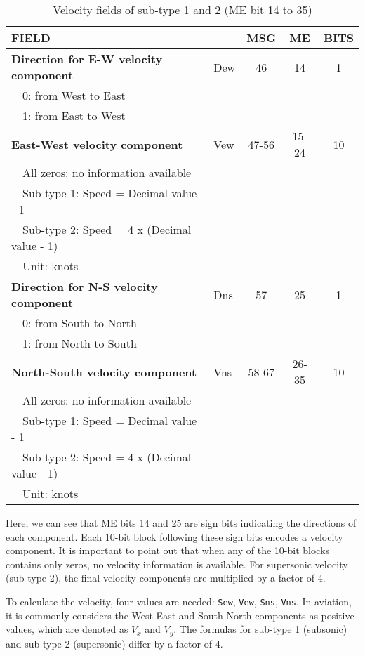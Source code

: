 \begin{table}[ht]
\caption{Velocity fields of sub-type 1 and 2 (ME bit 14 to 35)}
\label{tb:adsb-velocity-bits-14-35-gs}
\footnotesize
\begin{tabular}{|l|l|c|c|c|}
\hline
\textbf{FIELD} & & \textbf{MSG} & \textbf{ME} & \textbf{BITS} \\ \hline
\textbf{Direction for E-W velocity component} & Dew & 46 & 14 & 1\\
~~0: from West to East &&&&\\
~~1: from East to West &&&& \\ \hline
\textbf{East-West velocity component} & Vew & 47-56 & 15-24 & 10\\
~~All zeros: no information available &&&& \\
~~Sub-type 1: Speed = Decimal value - 1 &&&& \\
~~Sub-type 2: Speed = 4 x (Decimal value - 1) &&&& \\
~~Unit: knots &&&& \\ \hline
\textbf{Direction for N-S velocity component} & Dns & 57 & 25 & 1 \\
~~0: from South to North &&&& \\
~~1: from North to South &&&& \\ \hline
\textbf{North-South velocity component} & Vns & 58-67 & 26-35 & 10\\
~~All zeros: no information available &&&&\\
~~Sub-type 1: Speed = Decimal value - 1 &&&&\\
~~Sub-type 2: Speed = 4 x (Decimal value - 1) &&&&\\
~~Unit: knots &&&& \\ \hline
\end{tabular}
\end{table}

Here, we can see that ME bits 14 and 25 are sign bits indicating the directions of each component. Each 10-bit block following these sign bits encodes a velocity component. It is important to point out that when any of the 10-bit blocks contains only zeros, no velocity information is available. For supersonic velocity (sub-type 2), the final velocity components are multiplied by a factor of 4.

To calculate the velocity, four values are needed: \texttt{Sew}, \texttt{Vew},  \texttt{Sns}, \texttt{Vns}. In aviation, it is commonly considers the West-East and South-North components as positive values, which are denoted as $V_x$ and $V_y$. The formulas for sub-type 1 (subsonic) and sub-type 2 (supersonic) differ by a factor of 4.

